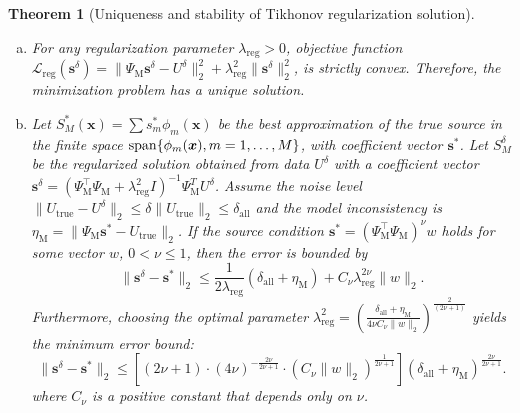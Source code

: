 \documentclass{article}
\theoremstyle{plain}
\newtheorem{theorem}{Theorem}[section]
\theoremstyle{definition}
\begin{document}
\begin{theorem}[Uniqueness and stability of Tikhonov regularization solution]
\label{Existence and Uniqueness}
\leavevmode\\[-8pt] %
\begin{enumerate}[(a)]
    \item \label{thm:Tikhonov_uniqueness} For any regularization parameter $\lambda_{\text{reg}}>0$, objective function $\mathcal{L}_{\text{reg}}(\boldsymbol{s}^{\delta})= \|\Psi_\text{M} \boldsymbol{s}^{\delta} - U^{\delta}\|_2^2 + \lambda_{\text{reg}}^2 \|\boldsymbol{s}^{\delta}\|_2^2$, is strictly convex. Therefore, the minimization problem has a unique solution.
    \item \label{thm:Tikhonov_stability} Let $S_M^*(\boldsymbol{x}) = \sum s_m^* \phi_m(\boldsymbol{x})$ be the best approximation of the true source in the finite space ${\rm{span}}\{\phi_m(\boldsymbol{x}), m=1,\ldots, M\}$,  with coefficient vector $\boldsymbol{s}^{*}$. Let $S_M^{\delta}$ be the regularized solution obtained from data $U^{\delta}$ with a coefficient vector $\boldsymbol{s}^{\delta} = (\Psi_\text{M}^\top\Psi_\text{M}+\lambda_{\text{reg}}^2 I)^{-1}\Psi_\text{M}^{T}U^{\delta}$. Assume the noise level $\|U_{\text{true}} - U^{\delta}\|_2 \le \delta \|U_{\text{true}}\|_2 \le \delta_{\text{all}}$ and the model inconsistency is $\eta_\text{M} = \|\Psi_\text{M} \boldsymbol{s}^{*} - U_{\text{true}}\|_2$. If the source condition $\boldsymbol{s}^{*} = (\Psi_\text{M}^\top \Psi_\text{M})^\nu w$ holds for some vector $w$,  $0<\nu\le1$,  then the error is bounded by
\begin{equation}
    \|\boldsymbol{s}^{\delta}-\boldsymbol{s}^{*}\|_2 \le \frac{1}{2 \lambda_{\text{reg}}}(\delta_{\text{all}}+\eta_\text{M})+ C_{\nu} \lambda_{\text{reg}}^{2\nu}\|w\|_2.
\end{equation}
Furthermore,  choosing the optimal parameter $\lambda_{\text{reg}}^2=\left(\frac{\delta_{\text{all}}+\eta_\text{M}}{4\nu C_{\nu}\|w\|_2}\right)^{\frac{2}{(2\nu+1)}}$ yields the minimum error bound: 
\begin{equation}
    \|\boldsymbol{s}^{\delta}-\boldsymbol{s}^{*}\|_2 \le \left[ (2\nu+1) \cdot (4\nu)^{-\frac{2\nu}{2\nu+1}} \cdot (C_{\nu}\|w\|_2)^{\frac{1}{2\nu+1}} \right] (\delta_{\text{all}}+\eta_\text{M})^{\frac{2\nu}{2\nu+1}}.
\end{equation}
where $C_{\nu}$ is a positive constant that depends only on $\nu$.
\end{enumerate}
\end{theorem}
\end{document}

